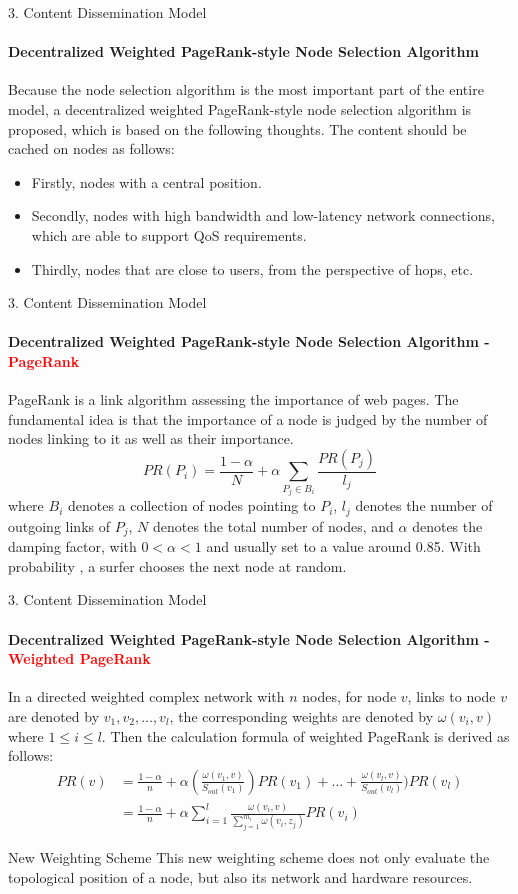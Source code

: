 \documentclass{beamer}		%
\begin{document}
\begin{frame}{3. Content Dissemination Model}
\framesubtitle{Decentralized Weighted PageRank-style Node Selection Algorithm}
Because the node selection algorithm is the most important part of the entire model, a decentralized weighted PageRank-style node selection algorithm is proposed, which is based on the following thoughts. The content should be cached on nodes as follows:
\begin{itemize}
    \item Firstly, nodes with a central position.
    \item Secondly, nodes with high bandwidth and low-latency network connections, which are able to support QoS requirements. 
    \item Thirdly, nodes that are close to users, from the perspective of hops, etc.
\end{itemize}
\end{frame}

\begin{frame}{3. Content Dissemination Model}
\framesubtitle{Decentralized Weighted PageRank-style Node Selection Algorithm - \textcolor{red}{PageRank}}
PageRank is a link algorithm assessing the importance of web pages. The fundamental idea is that the importance of a node is judged by the number of nodes linking to it as well as their importance.
\[
PR(P_i)=\frac{1-\alpha}{N}+\alpha\sum_{P_j\in B_i}{\frac{PR(P_j)}{l_j}}
\]
where $B_i$ denotes a collection of nodes pointing to $P_i$, $l_j$ denotes the number of outgoing links of $P_j$, $N$ denotes the total number of nodes, and $\alpha$ denotes the damping factor, with $0<\alpha<1$ and usually set to a value around 0.85. With probability , a surfer chooses the next node at random.
\end{frame}

\begin{frame}{3. Content Dissemination Model}
\framesubtitle{Decentralized Weighted PageRank-style Node Selection Algorithm - \textcolor{red}{Weighted PageRank}}
In a directed weighted complex network with $n$ nodes, for node $v$, links to node $v$ are denoted by $v_1,v_2,\dots,v_l$, the corresponding weights are denoted by $\omega(v_i,v)$ where $1\leq i\leq l$. Then the calculation formula of weighted PageRank is derived as follows:
\begin{equation}
\begin{aligned}
PR(v)&=\frac{1-\alpha}{n}+\alpha(\frac{\omega(v_1,v)}{S_{out}(v_1)})PR(v_1)+\dots+\frac{\omega(v_l,v)}{S_{out}(v_l)})PR(v_l)\\
&=\frac{1-\alpha}{n}+\alpha\sum_{i=1}^l\frac{\omega(v_i,v)}{\sum_{j=1}^{m_i}\omega(v_i,z_j)}PR(v_i)
\end{aligned}
\end{equation}
\begin{block}{New Weighting Scheme}
This new weighting scheme does not only evaluate the topological position of a node, but also its network and hardware resources.
\end{block}
\end{frame}{}
\end{document}
